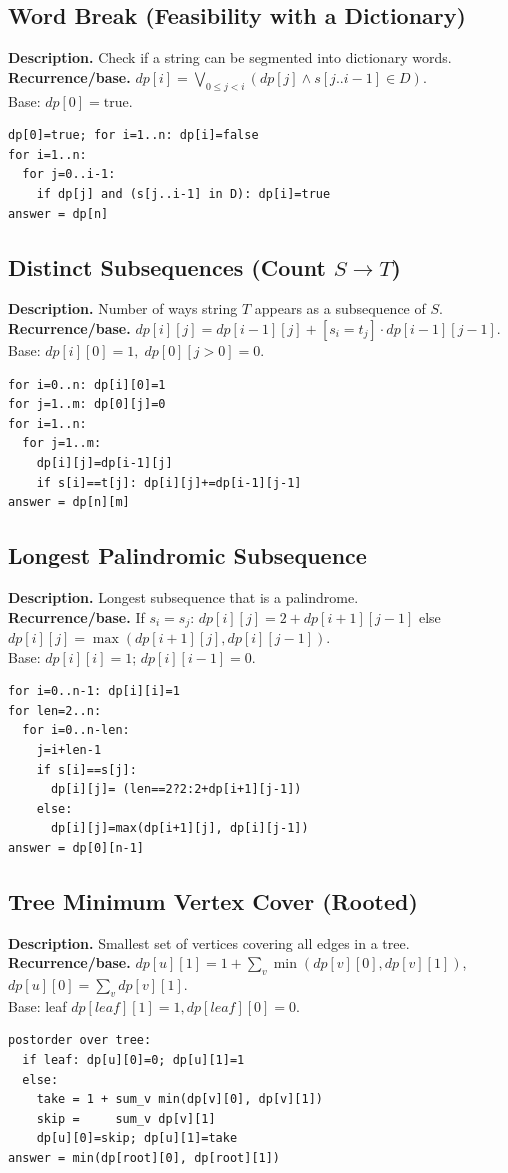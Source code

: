 \documentclass[9pt]{extarticle}
\begin{document}
\subsection{Word Break (Feasibility with a Dictionary)}
\textbf{Description.} Check if a string can be segmented into dictionary words.\\
\textbf{Recurrence/base.} \(dp[i]=\bigvee_{0\le j<i}(dp[j]\land s[j..i-1]\in D)\).\\  
Base: \(dp[0]=\text{true}\).
\begin{verbatim}
dp[0]=true; for i=1..n: dp[i]=false
for i=1..n:
  for j=0..i-1:
    if dp[j] and (s[j..i-1] in D): dp[i]=true
answer = dp[n]
\end{verbatim}

\subsection{Distinct Subsequences (Count \(S \to T\))}
\textbf{Description.} Number of ways string \(T\) appears as a subsequence of \(S\).\\
\textbf{Recurrence/base.} \(dp[i][j]=dp[i-1][j]+[s_i=t_j]\cdot dp[i-1][j-1]\).  \\
Base: \(dp[i][0]=1,\; dp[0][j>0]=0\).
\begin{verbatim}
for i=0..n: dp[i][0]=1
for j=1..m: dp[0][j]=0
for i=1..n:
  for j=1..m:
    dp[i][j]=dp[i-1][j]
    if s[i]==t[j]: dp[i][j]+=dp[i-1][j-1]
answer = dp[n][m]
\end{verbatim}

\subsection{Longest Palindromic Subsequence}
\textbf{Description.} Longest subsequence that is a palindrome.\\
\textbf{Recurrence/base.} If \(s_i=s_j\): \(dp[i][j]=2+dp[i+1][j-1]\) else \(dp[i][j]=\max(dp[i+1][j],dp[i][j-1])\).  \\
Base: \(dp[i][i]=1\); \(dp[i][i-1]=0\).
\begin{verbatim}
for i=0..n-1: dp[i][i]=1
for len=2..n:
  for i=0..n-len:
    j=i+len-1
    if s[i]==s[j]:
      dp[i][j]= (len==2?2:2+dp[i+1][j-1])
    else:
      dp[i][j]=max(dp[i+1][j], dp[i][j-1])
answer = dp[0][n-1]
\end{verbatim}

\subsection{Tree Minimum Vertex Cover (Rooted)}
\textbf{Description.} Smallest set of vertices covering all edges in a tree.\\
\textbf{Recurrence/base.} \(dp[u][1]=1+\sum_{v} \min(dp[v][0],dp[v][1])\),  \\
\(dp[u][0]=\sum_{v} dp[v][1]\). \\
Base: leaf \(dp[leaf][1]=1, dp[leaf][0]=0\).
\begin{verbatim}
postorder over tree:
  if leaf: dp[u][0]=0; dp[u][1]=1
  else:
    take = 1 + sum_v min(dp[v][0], dp[v][1])
    skip =     sum_v dp[v][1]
    dp[u][0]=skip; dp[u][1]=take
answer = min(dp[root][0], dp[root][1])
\end{verbatim}
\end{document}
